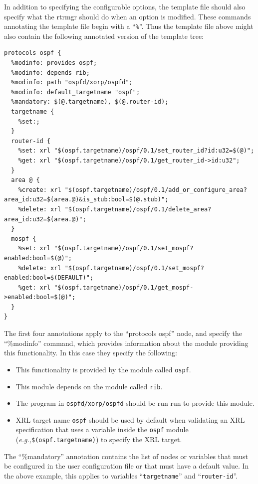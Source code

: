 \documentclass[11pt]{article}
\newcommand{\eg}{\emph{e.g.,}\xspace}
\begin{document}
In addition to specifying the configurable options, the template file
should also specify what the rtrmgr should do when an option is
modified.  These commands annotating the template file begin with a
``{\tt \%}''.  Thus the template file above might also contain the
following annotated version of the template tree:

\begin{verbatim}
protocols ospf {
  %modinfo: provides ospf;
  %modinfo: depends rib;
  %modinfo: path "ospfd/xorp/ospfd";
  %modinfo: default_targetname "ospf";
  %mandatory: $(@.targetname), $(@.router-id);
  targetname {
    %set:;
  }
  router-id {
    %set: xrl "$(ospf.targetname)/ospf/0.1/set_router_id?id:u32=$(@)";
    %get: xrl "$(ospf.targetname)/ospf/0.1/get_router_id->id:u32";
  }
  area @ {
    %create: xrl "$(ospf.targetname)/ospf/0.1/add_or_configure_area?area_id:u32=$(area.@)&is_stub:bool=$(@.stub)";
    %delete: xrl "$(ospf.targetname)/ospf/0.1/delete_area?area_id:u32=$(area.@)";
  }
  mospf {
    %set: xrl "$(ospf.targetname)/ospf/0.1/set_mospf?enabled:bool=$(@)";
    %delete: xrl "$(ospf.targetname)/ospf/0.1/set_mospf?enabled:bool=$(DEFAULT)";
    %get: xrl "$(ospf.targetname)/ospf/0.1/get_mospf->enabled:bool=$(@)";
  }
}
\end{verbatim}

The first four annotations apply to the ``protocols ospf'' node, and
specify the ``\%modinfo'' command, which provides information about
the module providing this functionality.  In this case they specify
the following:

\begin{itemize}

  \item This functionality is provided by the module called {\tt ospf}.

  \item This module depends on the module called {\tt rib}.

  \item The program in {\tt ospfd/xorp/ospfd} should be run run to
  provide this module.

  \item XRL target name {\tt ospf} should be used by default when validating
  an XRL specification that uses a variable inside the {\tt ospf} module
  (\eg {\tt \$(ospf.targetname)}) to specify the XRL target.

\end{itemize}

The ``\%mandatory'' annotation contains the list of nodes or variables
that must be configured in the user configuration file or that must
have a default value. In the above example, this applies to variables
``{\tt targetname}'' and ``{\tt router-id}''.
\end{document}
